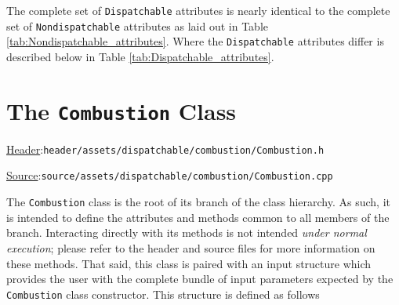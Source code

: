 \documentclass[12pt, letterpaper]{report}
\begin{document}
\noindent The complete set of \texttt{Dispatchable} attributes is nearly identical to the complete set of \texttt{Nondispatchable} attributes as laid out in Table \ref{tab:Nondispatchable_attributes}. Where the \texttt{Dispatchable} attributes differ is described below in Table \ref{tab:Dispatchable_attributes}.

\begin{table}[H]
    \centering
    \caption{\texttt{Dispatchable} attribute descriptions (where different from, or in addition to, the \texttt{Nondispatchable} attributes)}
    \label{tab:Dispatchable_attributes}
\end{table}

\section{The \texttt{Combustion} Class}

\begin{large}
\noindent\underline{Header}:\quad\texttt{header/assets/dispatchable/combustion/Combustion.h}\par
\noindent\underline{Source}:\quad\texttt{source/assets/dispatchable/combustion/Combustion.cpp}\par
\end{large}
\vspace{5mm}

The \texttt{Combustion} class is the root of its branch of the class hierarchy. As such, it is intended to define the attributes and methods common to all members of the branch. Interacting directly with its methods is not intended \textit{under normal execution}; please refer to the header and source files for more information on these methods. That said, this class is paired with an input structure which provides the user with the complete bundle of input parameters expected by the \texttt{Combustion} class constructor. This structure is defined as follows
\end{document}
